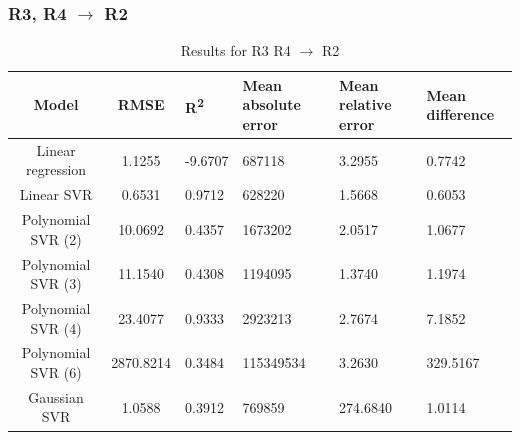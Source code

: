 \documentclass[a4paper,11pt]{article}
\begin{document}
\subsubsection{R3, R4 $\rightarrow$ R2}
\begin{table}[H]
	\centering
	\begin{adjustbox}{center}
		\begin{tabular}{c | c M{1.2cm} M{2.5cm} M{2.5cm} M{1.8cm}}
			Model & RMSE & R\textsuperscript{2} & Mean absolute error & Mean relative error & Mean difference \tabularnewline
			\hline
			Linear regression & 1.1255 & -9.6707 & 687118 & 3.2955 & 0.7742 \\
			Linear SVR & 0.6531 & 0.9712 & 628220 & 1.5668 & 0.6053 \\
			Polynomial SVR (2) & 10.0692 & 0.4357 & 1673202 & 2.0517 & 1.0677 \\
			Polynomial SVR (3) & 11.1540 & 0.4308 & 1194095 & 1.3740 & 1.1974 \\
			Polynomial SVR (4) & 23.4077 & 0.9333 & 2923213 & 2.7674 & 7.1852 \\
			Polynomial SVR (6) & 2870.8214 & 0.3484 & 115349534 & 3.2630 & 329.5167 \\
			Gaussian SVR & 1.0588 & 0.3912 & 769859 & 274.6840 & 1.0114 \\
		\end{tabular}
	\end{adjustbox}
	\\
	\caption{Results for R3 R4 $\rightarrow$ R2 }
	\label{tab:query_comp_007}
\end{table}
\end{document}
